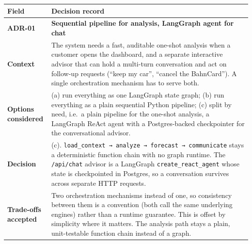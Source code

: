 \documentclass[
  11pt,
  a4paper,
  DIV=11,
  numbers=noendperiod,
  notitlepage]{scrreprt}
\newcounter{none} %
\begin{document}
{\def\LTcaptype{none} %
\begin{longtable}[]{@{}
  >{\raggedright\arraybackslash}p{}
  >{\raggedright\arraybackslash}p{}@{}}
\toprule\noalign{}
\begin{minipage}[b]{\linewidth}\raggedright
Field
\end{minipage} & \begin{minipage}[b]{\linewidth}\raggedright
Decision record
\end{minipage} \\
\midrule\noalign{}
\endhead
\bottomrule\noalign{}
\endlastfoot
\textbf{ADR-01} & \textbf{Sequential pipeline for analysis, LangGraph
agent for chat} \\
\textbf{Context} & The system needs a fast, auditable one-shot analysis
when a customer opens the dashboard, and a separate interactive advisor
that can hold a multi-turn conversation and act on follow-up requests
(``keep my car'', ``cancel the BahnCard''). A single orchestration
mechanism has to serve both. \\
\textbf{Options considered} & (a) run everything as one LangGraph state
graph; (b) run everything as a plain sequential Python pipeline; (c)
split by need, i.e.~a plain pipeline for the one-shot analysis, a
LangGraph ReAct agent with a Postgres-backed checkpointer for the
conversational advisor. \\
\textbf{Decision} & (c).
\texttt{load\_context\ →\ analyze\ →\ forecast\ →\ communicate} stays a
deterministic function chain with no graph runtime. The
\texttt{/api/chat} advisor is a LangGraph \texttt{create\_react\_agent}
whose state is checkpointed in Postgres, so a conversation survives
across separate HTTP requests. \\
\textbf{Trade-offs accepted} & Two orchestration mechanisms instead of
one, so consistency between them is a convention (both call the same
underlying engines) rather than a runtime guarantee. This is offset by
simplicity where it matters. The analysis path stays a plain,
unit-testable function chain instead of a graph. \\
\end{longtable}
}
\end{document}
